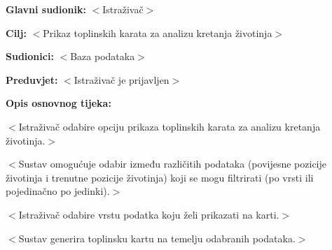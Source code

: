					\noindent {}
					\begin{packed_item}
						
						\item \textbf{Glavni sudionik: }$<$Istraživač$>$
						\item  \textbf{Cilj:} $<$Prikaz toplinskih karata za analizu kretanja životinja$>$
						\item  \textbf{Sudionici:} $<$Baza podataka$>$
						\item  \textbf{Preduvjet:} $<$Istraživač je prijavljen$>$
						\item  \textbf{Opis osnovnog tijeka:}
						
						\item[] \begin{packed_enum}
							
							\item $<$Istraživač odabire opciju prikaza toplinskih karata za analizu kretanja životinja.$>$
							\item $<$Sustav omogućuje odabir između različitih podataka (povijesne pozicije životinja i trenutne pozicije životinja) koji se mogu filtrirati (po vrsti ili pojedinačno po jedinki).$>$
							\item $<$Istraživač odabire vrstu podatka koju želi prikazati na karti.$>$
							\item $<$Sustav generira toplinsku kartu na temelju odabranih podataka.$>$
						\end{packed_enum}
						
					\end{packed_item}
					
